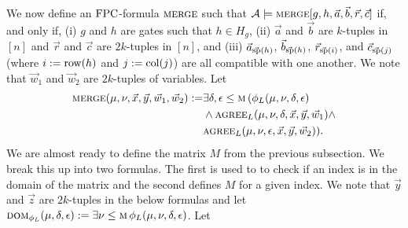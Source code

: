 \documentclass[../paper.tex]{subfiles}
\begin{document}
				
We now define an $\text{\upshape FPC}$-formula $\textsc{merge}$ such that $\mathcal{A} \models
\textsc{merge}[g, h, \vec{a}, \vec{b}, \vec{r}, \vec{c}]$ if, and only if, (i) $g$
and $h$ are gates such that $h \in H_g$, (ii) $\vec{a}$ and $\vec{b}$ are
$k$-tuples in $[n]$ and $\vec{r}$ and $\vec{c}$ are $2k$-tuples in $[n]$, and
(iii) $\vec{a}_{\vec{\text{sp}}(h)}$, $\vec{b}_{\vec{\text{sp}}(h)}$,
$\vec{r}_{\vec{\text{sp}}(i)}$, and $\vec{c}_{\vec{\text{sp}}(j)}$ (where $i := \text{row}
(h)$ and $j := \text{col} (j)$) are all compatible with one another. We note that
$\vec{w}_1$ and $\vec{w}_2$ are $2k$-tuples of variables. Let
\begin{align*}
	\textsc{merge} (\mu, \nu, \vec{x}, \vec{y}, \vec{w}_1, \vec{w}_2) := & \exists \delta, \epsilon \leq \textsc{m} \, ( \phi_L (\mu, \nu, \delta, \epsilon) \\ & \land \textsc{agree}_L (\mu, \nu , \delta, \vec{x}, \vec{y}, \vec{w}_1) \land \\ & \textsc{agree}_L (\mu, \nu , \epsilon, \vec{x}, \vec{y}, \vec{w}_2)).
\end{align*}
We are almost ready to define the matrix $M$ from the previous subsection. We
break this up into two formulas. The first is used to to check if an index is in
the domain of the matrix and the second defines $M$ for a given index. We note
that $\vec{y}$ and $\vec{z}$ are $2k$-tuples in the below formulas and let
$\textsc{dom}_{\phi_L} (\mu, \delta, \epsilon) := \exists \nu \leq \textsc{m} \, \phi_L
(\mu, \nu, \delta, \epsilon)$. Let
				
\end{document}
